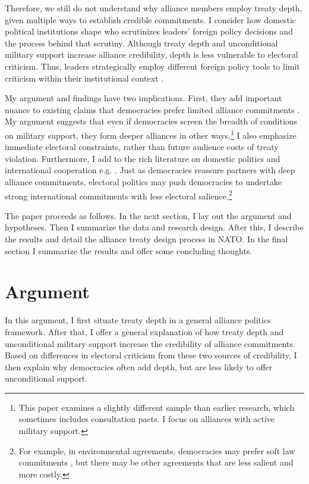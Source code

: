 \documentclass[12pt]{article}
\begin{document}
Therefore, we still do not understand why alliance members employ treaty depth, given multiple ways to establish credible commitments. 
I consider how domestic political institutions shape who scrutinizes leaders' foreign policy decisions and the process behind that scrutiny.
Although treaty depth and unconditional military support increase alliance credibility, depth is less vulnerable to electoral criticism. 
Thus, leaders strategically employ different foreign policy tools to limit criticism within their institutional context \cite{HydeSaunders2020}. 


My argument and findings have two implications. 
First, they add important nuance to existing claims that democracies prefer limited alliance commitments \citep{Mattes2012, Chibaetal2015, FjelstulReiter2019}. 
My argument suggests that even if democracies screen the breadth of conditions on military support, they form deeper alliances in other ways.\footnote{This paper examines a slightly different sample than earlier research, which sometimes includes consultation pacts. I focus on alliances with active military support.}  
I also emphasize immediate electoral constraints, rather than future audience costs of treaty violation.
Furthermore, I add to the rich literature on domestic politics and international cooperation e.g. \citep{DownesRocke1995, Fearon1998, Leeds1999, MattesRodriguez2014}. 
Just as democracies reassure partners with deep alliance commitments, electoral politics may push democracies to undertake strong international commitments with less electoral salience.\footnote{For example, in environmental agreements, democracies may prefer soft law commitments \citep{BoehmeltButkute2018}, but there may be other agreements that are less salient and more costly.} 


The paper proceeds as follows. 
In the next section, I lay out the argument and hypotheses. 
Then I summarize the data and research design. 
After this, I describe the results and detail the alliance treaty design process in NATO.
In the final section I summarize the results and offer some concluding thoughts. 


\section{Argument}


In this argument, I first situate treaty depth in a general alliance politics framework.  
After that, I offer a general explanation of how treaty depth and unconditional military support increase the credibility of alliance commitments. 
Based on differences in electoral criticism from these two sources of credibility, I then explain why democracies often add depth, but are less likely to offer unconditional support. 
\end{document}
